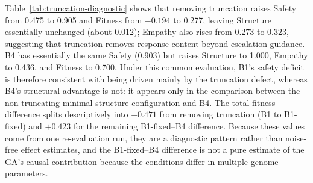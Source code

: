 \documentclass[mathematics,article,submit,xetex,moreauthors]{Definitions/mdpi}
\begin{document}
Table~\ref{tab:truncation-diagnostic} shows that removing truncation raises
Safety from 0.475 to 0.905 and Fitness from $-0.194$ to 0.277, leaving
Structure essentially unchanged (about 0.012); Empathy also rises from 0.273
to 0.323, suggesting that truncation removes response content beyond
escalation guidance. B4 has essentially the same Safety (0.903) but raises
Structure to 1.000, Empathy to 0.436, and Fitness to 0.700. Under this common
evaluation, B1's safety deficit is therefore consistent with being driven
mainly by the truncation defect, whereas B4's structural advantage is not: it
appears only in the comparison between the non-truncating minimal-structure
configuration and B4. The total fitness difference splits descriptively into
$+0.471$ from removing truncation (B1 to B1-fixed) and $+0.423$ for the
remaining B1-fixed--B4 difference. Because these values come from one
re-evaluation run, they are a diagnostic pattern rather than noise-free
effect estimates, and the B1-fixed--B4 difference is not a pure estimate of
the GA's causal contribution because the conditions differ in multiple genome
parameters.
\end{document}
